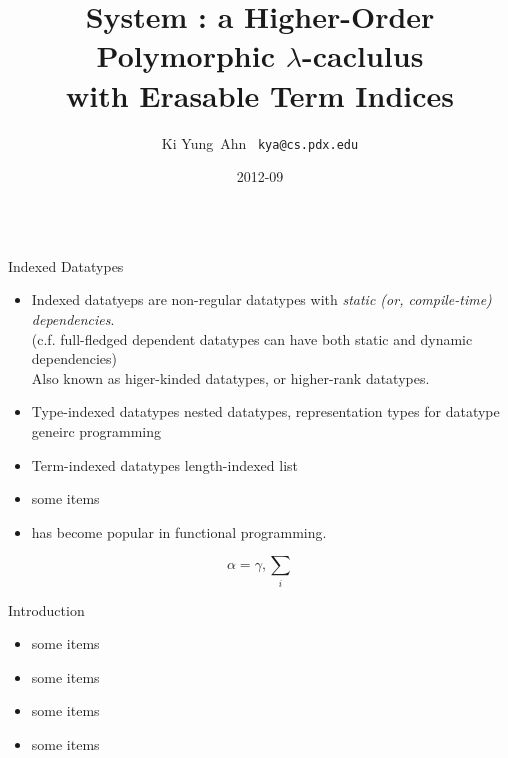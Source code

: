 \documentclass[final]{beamer}
\title[Fancy Posters]{{\VERYHuge System \Fi} {\Huge :}
		{\huge a Higher-Order Polymorphic $\lambda$-caclulus} \\
		{\huge with Erasable Term Indices}
  }
\author[Ki Yung Ahn]{ Ki Yung $\,$Ahn $\,$ {\Large\texttt{kya@cs.pdx.edu}} }
\institute[Portland State University]{
	Department of Computer Science, Portland State University }
\date{2012-09}
\begin{document}
\begin{frame}
\vfill
\begin{columns}[t]

\begin{column}{.48\linewidth}

\begin{block}{Indexed Datatypes}
\begin{itemize}
\item Indexed datatyeps are non-regular datatypes
	with \emph{static (or, compile-time) dependencies}.\\
        (c.f. full-fledged dependent datatypes can have
        both static and dynamic dependencies) \\
	Also known as higer-kinded datatypes, or higher-rank datatypes.
\item Type-indexed datatypes
      nested datatypes,
      representation types for datatype geneirc programming
\item Term-indexed datatypes
        length-indexed list
\item some items
\item has become popular in
        functional programming.
\end{itemize} $$\alpha=\gamma, \sum_{i}$$
\end{block}

\begin{block}{Introduction}
\begin{itemize}
\item some items
\item some items
\item some items
\item some items
\end{itemize}
\end{block}


\end{column}
\end{columns}
\end{frame}
\end{document}
